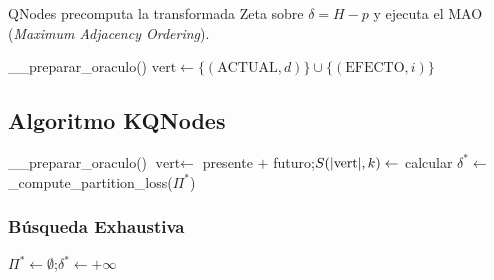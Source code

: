 QNodes precomputa la transformada Zeta sobre $\delta = H - p$ y ejecuta el MAO (\textit{Maximum Adjacency Ordering}).

\begin{algorithm}[H]
\DontPrintSemicolon
{}
\BlankLine
\_\_preparar\_oraculo()  
$\text{vert} \leftarrow \{(\text{ACTUAL},d)\} \cup \{(\text{EFECTO},i)\}$\;
\BlankLine
{}
\;
\caption{QNodes: MAO con oráculo Zeta.}
\label{alg:qnodes}
\end{algorithm}

\subsection{Algoritmo KQNodes}

\begin{algorithm}[H]
\DontPrintSemicolon
{}
\KwOut{$\kMIP$}
\BlankLine
\_\_preparar\_oraculo()  
$\text{vert} \leftarrow$ presente $+$ futuro;\quad $S(|\text{vert}|,k) \leftarrow$ calcular\;
\BlankLine
{}
$\delta^* \leftarrow$ \_compute\_partition\_loss($\Pi^*$)\;
\;
\caption{KQNodes: búsqueda de $k$-MIP con oráculo Zeta.}
\label{alg:kqnodes}
\end{algorithm}

\subsubsection{Búsqueda Exhaustiva}

\begin{algorithm}[H]
\DontPrintSemicolon
{}
\BlankLine
$\Pi^* \leftarrow \emptyset$;\quad $\delta^* \leftarrow +\infty$\;
\KwRet{$\Pi^*$}\;
\caption{\_exhaustive\_k\_partition: enumera las $\Stirling{n}{k}$ particiones.}
\label{alg:exhaustive}
\end{algorithm}

